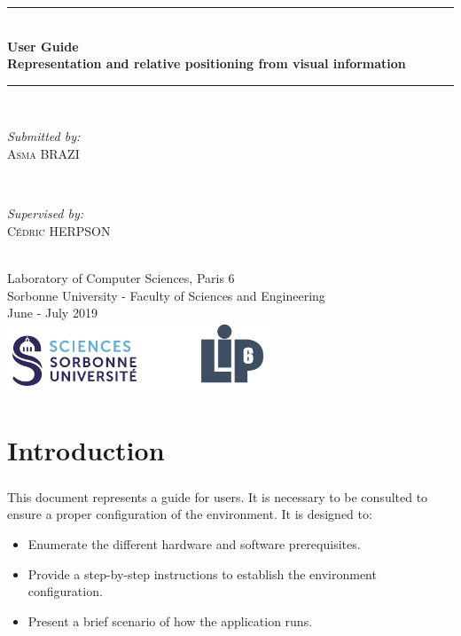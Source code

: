 \documentclass[12pt]{report}
\begin{document}
\begin{titlepage}

\newcommand{\HRule}{\rule{\linewidth}{0.5mm}} %

\center 
\HRule \\[0.4cm]
{ \huge \bfseries User Guide \\Representation and relative positioning from visual information}\\[0.4cm]
\HRule \\[1.5cm]

\begin{minipage}{0.4\textwidth}
	\begin{flushleft} \large
		\emph{Submitted by:}\\
		\textsc{Asma BRAZI}
	\end{flushleft}
\end{minipage}
~
\begin{minipage}{0.4\textwidth}
	\begin{flushright} \large
		\emph{Supervised by:} \\
		\textsc{Cédric HERPSON}\\
	\end{flushright}
\end{minipage}\\[4cm]


{\large Laboratory of Computer Sciences, Paris 6 \\ Sorbonne University - Faculty of Sciences and Engineering}\\[3cm] 
{\large June - July 2019 }\\[3cm] 
\includegraphics[width=0.6\textwidth]{res/logo.png}\\[1cm] 
\vfill %

\end{titlepage}
\tableofcontents
\chapter{Introduction}
\paragraph{}
This document represents a guide for users. It is necessary to be consulted to ensure a proper configuration of the environment. It is designed to:
\begin{itemize}
    \item Enumerate the different hardware and software prerequisites.
    \item Provide a step-by-step instructions to establish the environment configuration.
    \item Present a brief scenario of how the application runs.
\end{itemize}
\end{document}

